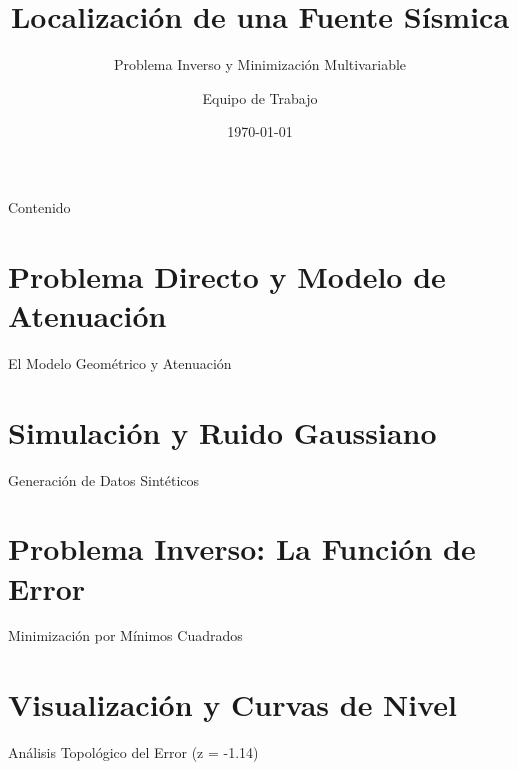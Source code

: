 \documentclass[aspectratio=169]{beamer}
\title{Localización de una Fuente Sísmica}
\subtitle{Problema Inverso y Minimización Multivariable}
\author{Equipo de Trabajo}
\date{\today}
\begin{document}
\begin{frame}
    \titlepage
\end{frame}

\begin{frame}{Contenido}
    \tableofcontents
\end{frame}

\section{Problema Directo y Modelo de Atenuación}
\begin{frame}{El Modelo Geométrico y Atenuación}
\end{frame}

\section{Simulación y Ruido Gaussiano}
\begin{frame}{Generación de Datos Sintéticos}
\end{frame}

\section{Problema Inverso: La Función de Error}
\begin{frame}{Minimización por Mínimos Cuadrados}
\end{frame}

\section{Visualización y Curvas de Nivel}
\begin{frame}{Análisis Topológico del Error (z = -1.14)}
\end{frame}
\end{document}
